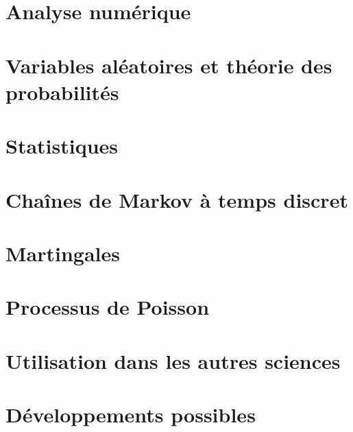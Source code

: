 \chapter{Analyse numérique}


\chapter{Variables aléatoires et théorie des probabilités}




\chapter{Statistiques}


\chapter{Chaînes de Markov à temps discret}


\chapter{Martingales}


\chapter{Processus de Poisson}


\chapter{Utilisation dans les autres sciences}


\chapter{Développements possibles}



%

 
